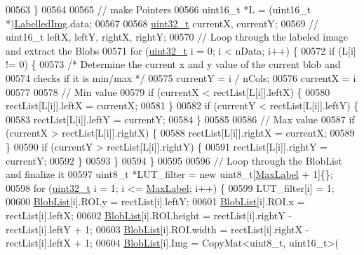\begin{DoxyCode}
00563   \}
00564 
00565   \textcolor{comment}{// make Pointers}
00566   uint16\_t *L = (uint16\_t *)\hyperlink{class_vision_1_1_segment_a4daa143f6cd4a753d3bbe45c6a67d27f}{LabelledImg}.data;
00567 
00568   \hyperlink{_soil_math_types_8h_a435d1572bf3f880d55459d9805097f62}{uint32\_t} currentX, currentY;
00569   \textcolor{comment}{// uint16\_t leftX, leftY, rightX, rightY;}
00570   \textcolor{comment}{// Loop through the labeled image and extract the Blobs}
00571   for (\hyperlink{_soil_math_types_8h_a435d1572bf3f880d55459d9805097f62}{uint32\_t} i = 0; i < nData; i++) \{
00572     \textcolor{keywordflow}{if} (L[i] != 0) \{
00573       \textcolor{comment}{/* Determine the current x and y value of the current blob and}
00574 \textcolor{comment}{      checks if it is min/max */}
00575       currentY = i / nCols;
00576       currentX = i %
00577 
00578       \textcolor{comment}{// Min value}
00579       \textcolor{keywordflow}{if} (currentX < rectList[L[i]].leftX) \{
00580         rectList[L[i]].leftX = currentX;
00581       \}
00582       \textcolor{keywordflow}{if} (currentY < rectList[L[i]].leftY) \{
00583         rectList[L[i]].leftY = currentY;
00584       \}
00585 
00586       \textcolor{comment}{// Max value}
00587       \textcolor{keywordflow}{if} (currentX > rectList[L[i]].rightX) \{
00588         rectList[L[i]].rightX = currentX;
00589       \}
00590       \textcolor{keywordflow}{if} (currentY > rectList[L[i]].rightY) \{
00591         rectList[L[i]].rightY = currentY;
00592       \}
00593     \}
00594   \}
00595 
00596   \textcolor{comment}{// Loop through the BlobList and finalize it}
00597   uint8\_t *LUT\_filter = \textcolor{keyword}{new} uint8\_t[\hyperlink{class_vision_1_1_segment_a22d2a688de65f4d25b164f8b2a03f4a9}{MaxLabel} + 1]\{\};
00598   \textcolor{keywordflow}{for} (\hyperlink{_soil_math_types_8h_a435d1572bf3f880d55459d9805097f62}{uint32\_t} i = 1; i <= \hyperlink{class_vision_1_1_segment_a22d2a688de65f4d25b164f8b2a03f4a9}{MaxLabel}; i++) \{
00599     LUT\_filter[i] = 1;
00600     \hyperlink{class_vision_1_1_segment_a74e0600a7dd49bd7110ee27bb4cd6e0e}{BlobList}[i].ROI.y = rectList[i].leftY;
00601     \hyperlink{class_vision_1_1_segment_a74e0600a7dd49bd7110ee27bb4cd6e0e}{BlobList}[i].ROI.x = rectList[i].leftX;
00602     \hyperlink{class_vision_1_1_segment_a74e0600a7dd49bd7110ee27bb4cd6e0e}{BlobList}[i].ROI.height = rectList[i].rightY - rectList[i].leftY + 1;
00603     \hyperlink{class_vision_1_1_segment_a74e0600a7dd49bd7110ee27bb4cd6e0e}{BlobList}[i].ROI.width = rectList[i].rightX - rectList[i].leftX + 1;
00604     \hyperlink{class_vision_1_1_segment_a74e0600a7dd49bd7110ee27bb4cd6e0e}{BlobList}[i].Img = CopyMat<uint8\_t, uint16\_t>(

\end{DoxyCode}
